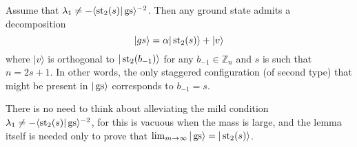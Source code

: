 \begin{lemma}\label{l:gs_dec}
Assume that $\lambda_1 \neq -\langle \operatorname{st}_2(s) | \operatorname{gs}\rangle^{-2}$. Then any ground state admits a decomposition
\[
|gs\rangle = \alpha |\operatorname{st}_2(s) \rangle + | v\rangle
\]
where $|v\rangle$ is orthogonal to $|\operatorname{st}_2(b_{-1})\rangle$ for any $b_{-1} \in \mathbb Z_n$ and $s$ is such that $n = 2s + 1$. In other words, the only staggered configuration (of second type) that might be present in $|\operatorname{gs}\rangle$ corresponds to $b_{-1} = s$. 
\end{lemma}
There is no need to think about alleviating the mild condition $\lambda_1 \neq -\langle \operatorname{st}_2(s) | \operatorname{gs}\rangle^{-2}$, for this is vacuous when the mass is large, and the lemma itself is needed only to prove that $\lim_{m \rightarrow \infty}|\operatorname{gs}\rangle = |\operatorname{st}_2(s)\rangle$.
